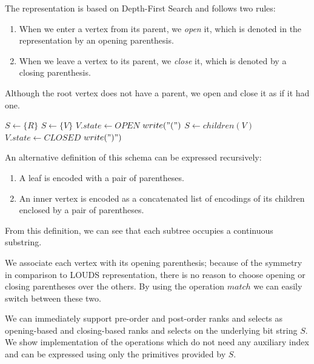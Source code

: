 The representation is based on Depth-First Search and follows two rules:
\begin{enumerate}
	\item When we enter a vertex from its parent, we \emph{open} it, which is denoted in the representation by an opening parenthesis.
	\item When we leave a vertex to its parent, we \emph{close} it, which is denoted by a closing parenthesis.
\end{enumerate}
Although the root vertex does not have a parent, we open and close it as if it had one.

\begin{algorithmic}
	\State $S \gets \{R\}$ 
		 
			\State $ S \gets \{V\}$ 
			\State $V.state \gets OPEN$
			\State $write("(")$
			\State $ S \gets children(V)$
		 
			\State $V.state \gets CLOSED$
			\State $write(")")$
		\EndIf
	\EndWhile
\EndFunction
\end{algorithmic}

An alternative definition of this schema can be expressed recursively:
\begin{enumerate}
	\item A leaf is encoded with a pair of parentheses.
	\item An inner vertex is encoded as a concatenated list of encodings of its children enclosed by a pair of parentheses.
\end{enumerate}
From this definition, we can see that each subtree occupies a continuous substring.

\bigskip

We associate each vertex with its opening parenthesis; because of the symmetry in comparison to LOUDS representation, there is no reason to choose opening or closing parentheses over the others.
By using the operation $match$ we can easily switch between these two.

We can immediately support pre-order and post-order ranks and selects as opening-based and closing-based ranks and selects on the underlying bit string $S$.
We show implementation of the operations which do not need any auxiliary index and can be expressed using only the primitives provided by $S$.


